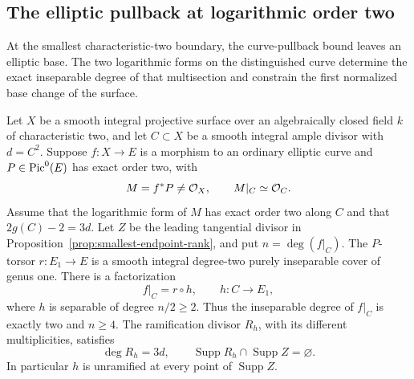 \subsection{The elliptic pullback at logarithmic order two}
\label{subsec:elliptic-endpoint-geometry}

At the smallest characteristic-two boundary, the curve-pullback bound
leaves an elliptic base.  The two logarithmic forms on the distinguished
curve determine the exact inseparable degree of that multisection and
constrain the first normalized base change of the surface.

\begin{proposition}
\label{prop:elliptic-endpoint-height}
Let $X$ be a smooth integral projective surface over an algebraically
closed field $k$ of characteristic two, and let $C\subset X$ be a
smooth integral ample divisor with $d=C^2$.
Suppose $f:X\to E$ is a morphism to an ordinary elliptic curve and
$P\in\operatorname{Pic}^0(E)$ has exact order two, with
\[
 M=f^*P\ne\mathcal O_X,\qquad M|_C\simeq\mathcal O_C.
\]
Assume that the logarithmic form of $M$ has exact order two along $C$
and that $2g(C)-2=3d$.  Let $Z$ be the leading tangential divisor in
Proposition~\ref{prop:smallest-endpoint-rank}, and put
$n=\deg(f|_C)$.
The $P$-torsor $r:E_1\to E$ is a smooth integral degree-two purely
inseparable cover of genus one.  There is a factorization
\begin{equation}\label{eq:elliptic-endpoint-factorization}
 f|_C=r\circ h,\qquad h:C\longrightarrow E_1,
\end{equation}
where $h$ is separable of degree $n/2\geq2$.
Thus the inseparable degree of $f|_C$ is exactly two and $n\geq4$.
The ramification divisor $R_h$, with its different multiplicities,
satisfies
\begin{equation}\label{eq:elliptic-endpoint-ramification}
 \deg R_h=3d,\qquad
 \operatorname{Supp}R_h\cap\operatorname{Supp}Z=\varnothing.
\end{equation}
In particular $h$ is unramified at every point of
$\operatorname{Supp}Z$.
\end{proposition}

